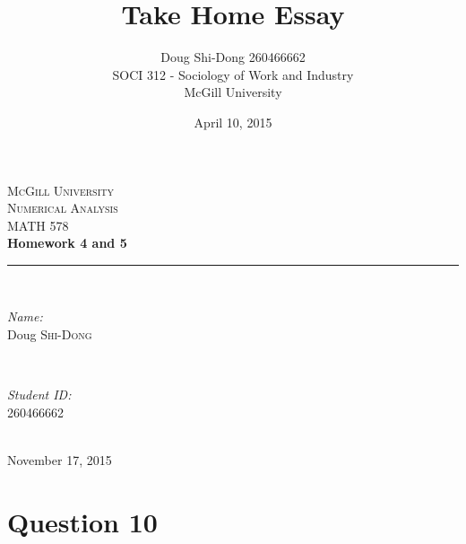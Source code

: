 \documentclass[letterpaper,12pt,]{article}
\title{Take Home Essay}
\author{
        Doug Shi-Dong 260466662 \\
        SOCI 312 - Sociology of Work and Industry\\
        McGill University
}
\date{April 10, 2015}
\begin{document}
\begin{titlepage}

\newcommand{\HRule}{\rule{\linewidth}{0.5mm}} %

\center %
 


\textsc{\LARGE McGill University}\\[3.5cm]
\textsc{\Large Numerical Analysis}\\[0.5cm] 
\textsc{\large MATH 578}\\[2.5cm]


{ \huge \bfseries Homework 4 and 5}\\[1.5cm] %

\HRule \\[0.4cm]

\begin{minipage}{0.4\textwidth}
\begin{flushleft} \large
\emph{Name:}\\
Doug \textsc{Shi-Dong} %
\end{flushleft}
\end{minipage}
~
\begin{minipage}{0.4\textwidth}
\begin{flushright} \large
\emph{Student ID:} \\
260466662\\
\end{flushright}
\end{minipage}\\[4cm]

\vfill{}
{\large November 17, 2015}\\[2cm]

\end{titlepage}

\section*{Question 10}
\end{document}
